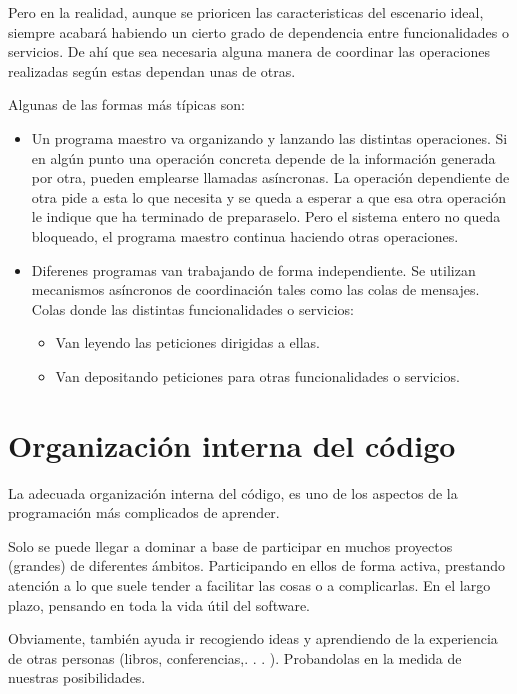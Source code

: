 \documentclass[spanish,12pt,a4paper,final,oneside]{book}
\begin{document}
Pero en la realidad, aunque se prioricen las caracteristicas del escenario ideal, siempre acabará habiendo un cierto grado de dependencia entre funcionalidades o servicios. De ahí que sea necesaria alguna manera de coordinar las operaciones realizadas según estas dependan unas de otras.

Algunas de las formas más típicas son:
\begin{itemize}
 
\item Un programa maestro va organizando y lanzando las distintas operaciones. Si en algún punto una operación concreta depende de la información generada por otra, pueden emplearse llamadas asíncronas. La operación dependiente de otra pide a esta lo que necesita y se queda a esperar a que esa otra operación le indique que ha terminado de preparaselo. Pero el sistema entero no queda bloqueado, el programa maestro continua haciendo otras operaciones. 

\item Diferenes programas van trabajando de forma independiente. Se utilizan mecanismos asíncronos de coordinación tales como las colas de mensajes. Colas donde las distintas funcionalidades o servicios:
\begin{itemize}
\item Van leyendo las peticiones dirigidas a ellas.
\item Van depositando peticiones para otras funcionalidades o servicios.
\end{itemize}

\end{itemize}


\chapter{Organización interna del código}

La adecuada organización interna del código, es uno de los aspectos de la programación más complicados de aprender.

Solo se puede llegar a dominar a base de participar en muchos proyectos (grandes) de diferentes ámbitos. Participando en ellos de forma activa, prestando atención a lo que suele tender a facilitar las cosas o a complicarlas. En el largo plazo, pensando en toda la vida útil del software.

Obviamente, también ayuda ir recogiendo ideas y aprendiendo de la experiencia de otras personas (libros, conferencias,. . . ). Probandolas en la medida de nuestras posibilidades.
\end{document}
